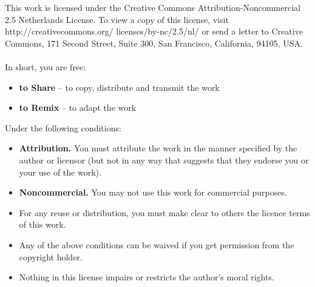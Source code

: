 \clearemptydoublepage
\noindent\thispagestyle{empty}
This work is licensed under the Creative Commons Attribution-Noncommercial 2.5 Netherlands License. To view a copy of this license, visit http://creativecommons.org/ licenses/by-nc/2.5/nl/ or send a letter to Creative Commons, 171 Second Street, Suite 300, San Francisco, California, 94105, USA.\\\\
In short, you are free:
  \begin{itemize}
    \item \textbf{to Share} -- to copy, distribute and transmit the work
    \item \textbf{to Remix} -- to adapt the work
  \end{itemize}
  Under the following conditions:
  \begin{itemize}
    \item \textbf{Attribution.} You must attribute the work in the manner specified by the author or licensor (but not in any way that suggests that they endorse you or your use of the work).
    \item \textbf{Noncommercial.} You may not use this work for commercial purposes.
    \item For any reuse or distribution, you must make clear to others the licence terms of this work.
    \item Any of the above conditions can be waived if you get permission from the copyright holder.
    \item Nothing in this license impairs or restricts the author's moral rights.
  \end{itemize}
\normalsize


\clearemptydoublepage
